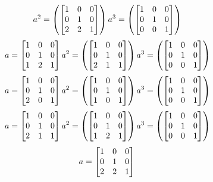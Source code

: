 \begin{mdframed}[style=darkAnswer,frametitle={Joe Starr}]
\begin{itemize}
{$$a^{ 2 }=\left( \begin{bmatrix}1&0&0\\0&1&0\\2&2&1\end{bmatrix} \right)
a^{ 3 }=\left( \begin{bmatrix}1&0&0\\0&1&0\\0&0&1\end{bmatrix} \right)
$$ $$
a= \begin{bmatrix}1&0&0\\0&1&0\\1&2&1\end{bmatrix} \\
a^{ 2 }=\left( \begin{bmatrix}1&0&0\\0&1&0\\2&1&1\end{bmatrix} \right)
a^{ 3 }=\left( \begin{bmatrix}1&0&0\\0&1&0\\0&0&1\end{bmatrix} \right)
$$ $$
a= \begin{bmatrix}1&0&0\\0&1&0\\2&0&1\end{bmatrix} \\
a^{ 2 }=\left( \begin{bmatrix}1&0&0\\0&1&0\\1&0&1\end{bmatrix} \right)
a^{ 3 }=\left( \begin{bmatrix}1&0&0\\0&1&0\\0&0&1\end{bmatrix} \right)
$$ $$
a= \begin{bmatrix}1&0&0\\0&1&0\\2&1&1\end{bmatrix} \\
a^{ 2 }=\left( \begin{bmatrix}1&0&0\\0&1&0\\1&2&1\end{bmatrix} \right)
a^{ 3 }=\left( \begin{bmatrix}1&0&0\\0&1&0\\0&0&1\end{bmatrix} \right)
$$ $$
a= \begin{bmatrix}1&0&0\\0&1&0\\2&2&1\end{bmatrix} \\
$$}
\end{itemize}
\end{mdframed}
